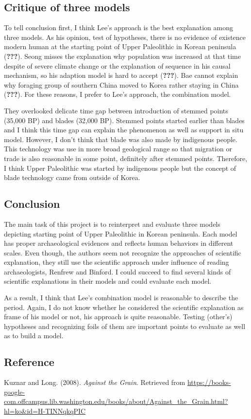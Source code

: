 \documentclass[american,man]{apa6}
\begin{document}
\subsection{Critique of three models}\label{critique-of-three-models}

To tell conclusion first, I think Lee's approach is the best explanation
among three models. As his opinion, test of hypotheses, there is no
evidence of existence modern human at the starting point of Upper
Paleolithic in Korean peninsula ({\textbf{???}}). Seong misses the
explanation why population was increased at that time despite of severe
climate change or the explanation of sequence in his causal mechanism,
so his adaption model is hard to accept ({\textbf{???}}). Bae cannot
explain why foraging group of southern China moved to Korea rather
staying in China ({\textbf{???}}). For these reasons, I prefer to Lee's
approach, the combination model.

They overlooked delicate time gap between introduction of stemmed points
(35,000 BP) and blades (32,000 BP). Stemmed points started earlier than
blades and I think this time gap can explain the phenomenon as well as
support in situ model. However, I don't think that blade was also made
by indigenous people. This technology was use in more broad geological
range so that migration or trade is also reasonable in some point,
definitely after stemmed points. Therefore, I think Upper Paleolithic
was started by indigenous people but the concept of blade technology
came from outside of Korea.

\subsection{Conclusion}\label{conclusion}

The main task of this project is to reinterpret and evaluate three
models depicting starting point of Upper Paleolithic in Korean
peninsula. Each model has proper archaeological evidences and reflects
human behaviors in different scales. Even though, the authors seem not
recognize the approaches of scientific explanation, they still use the
scientific approach under influence of reading archaeologists, Renfrew
and Binford. I could succeed to find several kinds of scientific
explanations in their models and could evaluate each model.

As a result, I think that Lee's combination model is reasonable to
describe the period. Again, I do not know whether he considered the
scientific explanation as frame of his model or not, his approach is
quite reasonable. Testing (other's) hypotheses and recognizing foils of
them are important points to evaluate as well as to build a model.

\subsection*{Reference}\label{reference}

Kuznar and Long. (2008). \emph{Against the Grain}. Retrieved from
\url{https://books-google-com.offcampus.lib.washington.edu/books/about/Against_the_Grain.html?hl=ko\&id=H-TINNqkqPIC}
\end{document}
